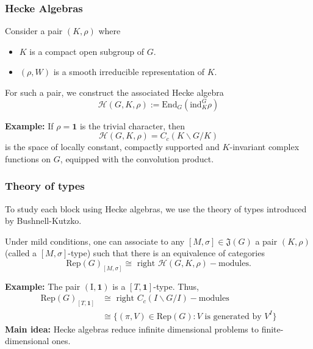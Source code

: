 \documentclass{beamer}
\newcommand{\Rep}{\mathrm{Rep}}
\newcommand{\Irr}{\mathrm{Irr}}
\newcommand{\End}{\mathrm{End}}
\newcommand{\ind}{\mathrm{ind}}
\newcommand{\cH}{\mathcal{H}}
\theoremstyle{plain}
\begin{document}
\begin{frame}
    \frametitle{Hecke Algebras}
    Consider a pair $(K,\rho)$ where
    \begin{itemize}
        \item $K$ is a compact open subgroup of $G$.
        \item $(\rho,W)$ is a smooth irreducible representation of $K$.\pause
    \end{itemize}
    For such a pair, we construct the associated Hecke algebra
    \[\cH(G,K,\rho):=\End_G(\ind_K^G\rho)\]\pause

    \textbf{Example:} If $\rho=\textbf{1}$ is the trivial character, then 
    \[\cH(G,K,\rho)=C_c(K\backslash G/K)\]
    is the space of locally constant, compactly supported and $K$-invariant complex functions on $G$, equipped with the convolution product.
    
    
\end{frame}



\begin{frame}
    \frametitle{Theory of types}
    To study each block using Hecke algebras, we use the theory of types introduced by Bushnell-Kutzko.\pause

    \begin{theorem}
        Under mild conditions, one can associate to any $[M,\sigma]\in\mathfrak{J}(G)$ a pair $(K,\rho)$ (called a $[M,\sigma]$-type) such that there is an equivalence of categories
        \[ \Rep(G)_{[M,\sigma]}\cong\text{ right }\cH(G,K,\rho)-\text{modules}.\]
    \end{theorem}\pause

    \textbf{Example:} The pair $(\text{I},\mathbf{1})$ is a $[T,\mathbf{1}]$-type. \pause
    Thus, 
    \begin{align*}
        \Rep(G)_{[T,\mathbf{1}]}&\cong\text{ right }C_c(I\backslash G/I)-\text{modules}\\ 
        &\cong\{(\pi,V)\in\Rep(G):V\text{ is generated by }V^I\}
    \end{align*}\pause
    \textbf{Main idea:} Hecke algebras reduce infinite dimensional problems to finite-dimensional ones.
   
\end{frame}

\iffalse
\begin{frame}
    \frametitle{Examples}
    \textbf{Example:} $\cH(G,K,\mathbf{1})\cong C_c(K\backslash G/K)$ with the convolution product. There is a bijection
    \[\{(\pi,V)\in\Irr(G):V^K\neq 0\}\longleftrightarrow \text{ irreducible }C_c(K\backslash G/K) \text{-mod.}\]
    \vspace{0.5cm}
\end{frame}
\fi
\end{document}
